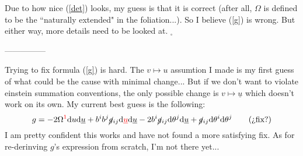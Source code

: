 \documentclass[a4paper,11pt]{article}
\renewcommand{\d}{{\mathrm{d}}}
\begin{document}
Due to how nice (\ref{det}) looks, my guess is that it is correct (after all, $\Omega$ is defined to be the ``naturally extended" in the foliation...). So I believe (\ref{g}) is wrong. But either way, more details need to be looked at. $_\square$
\begin{center}
    ---------------
\end{center}
Trying to fix formula (\ref{g}) is hard. The $v\mapsto u$ assumtion I made is my first guess of what could be the cause with minimal change... But if we don't want to violate einstein summation conventions, the only possible change is $v \mapsto \underline{u}$ which doesn't work on its own. My current best guess is the following:
\begin{equation}
    g=-2\Omega^{\color{red}1\color{black}} \d u \d \underline{u} + b^ib^j\cancel{g}_{ij}\d\color{red}\underline{u}\color{black}\d\underline{u} - 2b^i\cancel{g}_{ij}\d\theta^j\d\underline{u}+\cancel{g}_{ij}\d\theta^i\d\theta^j \tag{¿fix?}
\end{equation}
I am pretty confident this works and have not found a more satisfying fix. As for re-derinving $g$'s expression from scratch, I'm not there yet...
\end{document}
